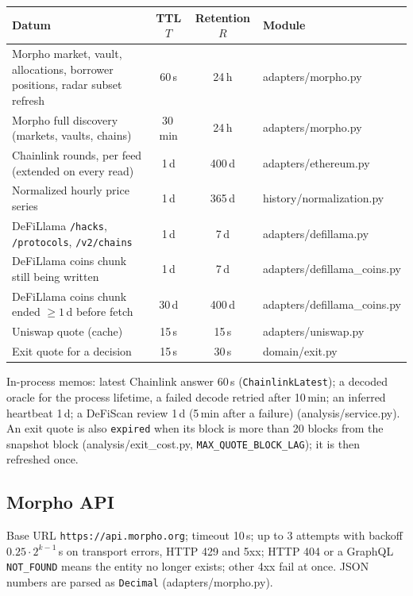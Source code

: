 \documentclass[11pt,a4paper]{article}
\newcommand{\code}[1]{\texttt{#1}}
\newcommand{\src}[1]{\textsf{\small #1}}
\begin{document}
\begin{center}\small
\begin{tabularx}{\textwidth}{@{}YccL{4.1cm}@{}}
\toprule
Datum & TTL $T$ & Retention $R$ & Module \\
\midrule
Morpho market, vault, allocations, borrower positions, radar subset refresh & 60\,s & 24\,h & \src{adapters/morpho.py} \\
Morpho full discovery (markets, vaults, chains) & 30\,min & 24\,h & \src{adapters/morpho.py} \\
Chainlink rounds, per feed (extended on every read) & 1\,d & 400\,d & \src{adapters/ethereum.py} \\
Normalized hourly price series & 1\,d & 365\,d & \src{history/normalization.py} \\
DeFiLlama \code{/hacks}, \code{/protocols}, \code{/v2/chains} & 1\,d & 7\,d & \src{adapters/defillama.py} \\
DeFiLlama coins chunk still being written & 1\,d & 7\,d & \src{adapters/defillama\_coins.py} \\
DeFiLlama coins chunk ended $\geq 1$\,d before fetch & 30\,d & 400\,d & \src{adapters/defillama\_coins.py} \\
Uniswap quote (cache) & 15\,s & 15\,s & \src{adapters/uniswap.py} \\
Exit quote for a decision & 15\,s & 30\,s & \src{domain/exit.py} \\
\bottomrule
\end{tabularx}
\end{center}
In-process memos: latest Chainlink answer 60\,s (\code{ChainlinkLatest}); a
decoded oracle for the process lifetime, a failed decode retried after 10\,min;
an inferred heartbeat 1\,d; a DeFiScan review 1\,d (5\,min after a failure)
(\src{analysis/service.py}). An exit quote is also \code{expired} when its block
is more than 20 blocks from the snapshot block (\src{analysis/exit\_cost.py},
\code{MAX\_QUOTE\_BLOCK\_LAG}); it is then refreshed once.

\subsection{Morpho API}

Base URL \code{https://api.morpho.org}; timeout 10\,s; up to 3 attempts with
backoff $0.25\cdot 2^{k-1}$\,s on transport errors, HTTP 429 and 5xx; HTTP 404 or
a GraphQL \code{NOT\_FOUND} means the entity no longer exists; other 4xx fail at
once. JSON numbers are parsed as \code{Decimal} (\src{adapters/morpho.py}).
\end{document}

